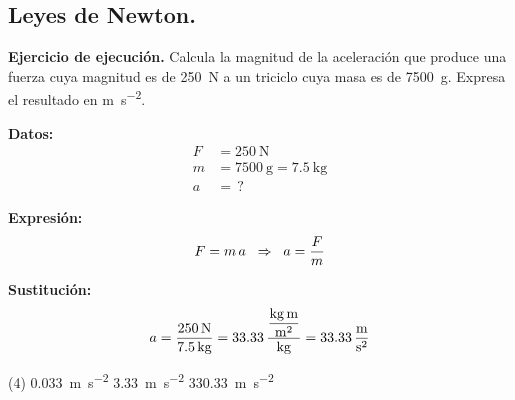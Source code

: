 \documentclass[12pt, letter]{exam}
\begin{document}
\begin{questions}

    \section{Leyes de Newton.}

    \setcounter{question}{15} \question \textbf{Ejercicio de ejecución.} Calcula la magnitud de la aceleración que produce una fuerza cuya magnitud es de \SI{250}{\newton} a un triciclo cuya masa es de \SI{7500}{\gram}. Expresa el resultado en \unit{\meter\per\square\second}.
    
    \vspace*{0.3cm}
    \begin{minipage}[t]{0.4\linewidth}
    \textbf{Datos:}
    \begin{align*}
    F &= \SI{250}{\newton} \\
    m &= \SI{7500}{\gram} = \SI{7.5}{\kilo\gram} \\
    a &= \, ?
    \end{align*}
    \end{minipage}
    \hspace{1cm}
    \begin{minipage}[t]{0.4\linewidth}
    \textbf{Expresión:}
    \begin{align*}
    F = m \, a \hspace{0.2cm} \Rightarrow \hspace{0.2cm} a = \dfrac{F}{m}
    \end{align*}
    \end{minipage}

    \vspace*{0.3cm}
    \textbf{Sustitución:}
    \begin{align*}
    a = \dfrac{\SI{250}{\newton}}{\SI{7.5}{\kilo\gram}} = \num{33.33} \, \dfrac{\displaystyle \unit[per-mode=fraction]{\kilo\gram\meter\per\square\meter}}{\unit{\kilo\gram}} = \SI[per-mode=fraction]{33.33}{\meter\per\square\second}
    \end{align*}
    \begin{tasks}(4)
        \task \SI{0.033}{\meter\per\square\second}
        \task \SI{3.33}{\meter\per\square\second}
        \task {}
        \task \SI{330.33}{\meter\per\square\second}
    \end{tasks}


\end{questions}
\end{document}
